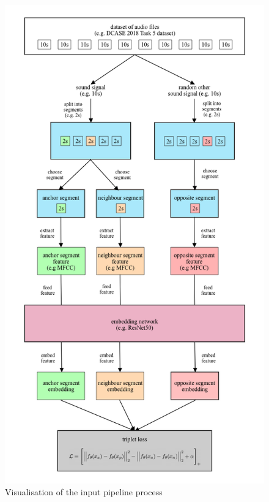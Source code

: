 \begin{figure}[htbp]
	\centering
	\includegraphics[scale=0.4]{img/Input_Pipeline_Visualisation.png}
	\caption{Visualisation of the input pipeline process}
	\label{fig:Input-Pipeline-Visualisation}
\end{figure}

